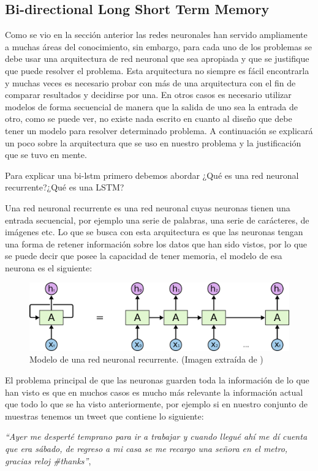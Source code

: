 \subsection{Bi-directional Long Short Term Memory}

\par Como se vio en la sección anterior las redes neuronales han servido ampliamente a muchas áreas del conocimiento, sin embargo, para cada uno de los problemas se debe usar una arquitectura de red neuronal que sea apropiada y que se justifique que puede resolver el problema. Esta arquitectura no siempre es fácil encontrarla y muchas veces es necesario probar con más de una arquitectura con el fin de comparar resultados y decidirse por una. En otros casos es necesario utilizar modelos de forma secuencial de manera que la salida de uno sea la entrada de otro, como se puede ver, no existe nada escrito en cuanto al diseño que debe tener un modelo para resolver determinado problema. A continuación se explicará un poco sobre la arquitectura que se uso en nuestro problema y la justificación que se tuvo en mente.

\par Para explicar una \gls{bi-lstm} primero debemos abordar ¿Qué es una red neuronal recurrente?¿Qué es una LSTM?

\par Una red neuronal recurrente es una red neuronal cuyas neuronas tienen una entrada secuencial, por ejemplo una serie de palabras, una serie de carácteres, de imágenes etc. Lo que se busca con esta arquitectura es que las neuronas tengan una forma de retener información sobre los datos que han sido vistos, por lo que se puede decir que posee la capacidad de tener memoria, el modelo de esa neurona es el siguiente:

\begin{figure}[H]
	\centering
	\includegraphics[width=\textwidth]{imagenes/RNN-unrolled.png}
	\caption[]{Modelo de una red neuronal recurrente. (Imagen extraída de \textcite{christopher_olah_2015}) }
\end{figure}

\par El problema principal de que las neuronas guarden toda la información de lo que han visto es que en muchos casos es mucho más relevante la información actual que todo lo que se ha visto anteriormente, por ejemplo si en nuestro conjunto de muestras tenemos un tweet que contiene lo siguiente:
\vspace{5pt}
\begin{center}
	\textit{``Ayer me desperté temprano para ir a trabajar y cuando llegué ahí me dí cuenta que era sábado, de regreso a mi casa se me recargo una señora en el metro, gracias reloj \#thanks''},
	\label{fig:frase}
\end{center}
\vspace{5pt}

